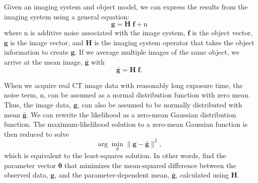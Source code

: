 Given an imaging system and object model, we can express the results from the imaging system using a general equation:
%
\begin{equation}
\label{eq:gHf}
\mathbf{g} = \mathbf{H} \; \mathbf{f} + \mathrm{n}
\end{equation}
%
where $\mathrm{n}$ is additive noise associated with the image system, $\mathbf{f}$ is the object vector, $\mathbf{g}$ is the image vector, and $\mathbf{H}$ is the imaging system operator that takes the object information to create $\mathbf{g}$.  If we average multiple images of the same object, we arrive at the mean image, $\mathbf{\bar{g}}$ with
%
\begin{equation}
\label{eq:gbar}
\mathbf{\bar{g}} = \mathbf{H} \; \mathbf{f}.
\end{equation}

When we acquire real CT image data with reasonably long exposure time, the noise term, $\mathrm{n}$, can be assumed as a normal distribution function with zero mean.  Thus, the image data, $\mathbf{g}$, can also be assumed to be normally distributed with mean $\mathbf{\bar{g}}$.  We can rewrite the likelihood as a zero-mean Gaussian distribution function.  The maximum-likelihood solution to a zero-mean Gaussian function is then reduced to solve
%
\begin{equation}
\arg\min_{\theta} \| \mathbf{g} - \mathbf{\bar{g}} \|^2,
\label{eq:least_square}
\end{equation}
%
which is equivalent to the least-squares solution.  In other words, find the parameter vector $\boldsymbol{\theta}$ that minimizes the mean-squared difference between the observed data, $\mathbf{g}$, and the parameter-dependent mean, $\mathbf{\bar{g}}$, calculated using $\mathbf{H}$.  


